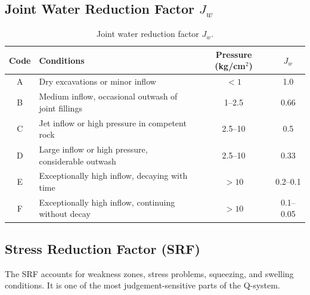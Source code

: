 \documentclass[a4paper,12pt]{article}
\begin{document}
\subsection{Joint Water Reduction Factor \(J_w\)}

\begin{table}[H]
\centering
\small
\begin{tabularx}{\textwidth}{c Y c c}
\toprule
\textbf{Code} & \textbf{Conditions} & \textbf{Pressure (kg/cm\(^2\))} & \textbf{\(J_w\)} \\
\midrule
A & Dry excavations or minor inflow & \(<1\) & 1.0 \\
B & Medium inflow, occasional outwash of joint fillings & 1--2.5 & 0.66 \\
C & Jet inflow or high pressure in competent rock & 2.5--10 & 0.5 \\
D & Large inflow or high pressure, considerable outwash & 2.5--10 & 0.33 \\
E & Exceptionally high inflow, decaying with time & \(>10\) & 0.2--0.1 \\
F & Exceptionally high inflow, continuing without decay & \(>10\) & 0.1--0.05 \\
\bottomrule
\end{tabularx}
\caption{Joint water reduction factor \(J_w\).}
\label{tab:jw}
\end{table}

\subsection{Stress Reduction Factor (SRF)}
\label{sec:srf}

The SRF accounts for weakness zones, stress problems, squeezing, and swelling conditions.
It is one of the most judgement-sensitive parts of the Q-system.
\end{document}
